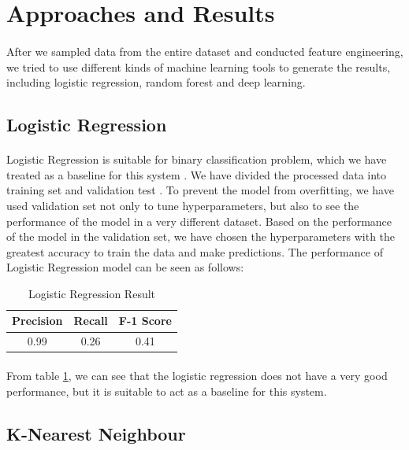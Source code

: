 \documentclass[fleqn,11pt]{olplainarticle}
\begin{document}
\section{Approaches and Results}\label{appres}
\paragraph*{}
After we sampled data from the entire dataset and conducted feature engineering, we tried to use different kinds of machine learning tools to generate the results, including logistic regression, random forest and deep learning.

\subsection{Logistic Regression}\label{lr}
\paragraph*{}
Logistic Regression is suitable for binary classification problem, which we have treated as a baseline for this system \citep{menard_lr}. We have divided the processed data into training set and validation test \citep{scikit-learn}. To prevent the model from overfitting, we have used validation set not only to tune hyperparameters, but also to see the performance of the model in a very different dataset. Based on the performance of the model in the validation set, we have chosen the hyperparameters with the greatest accuracy to train the data and make predictions. The performance of Logistic Regression model can be seen as follows:

\begin{table}[!htbp]
\centering
\caption{Logistic Regression Result}\label{tab:lr}
\begin{tabular}{ccc}
\toprule
Precision& Recall& F-1 Score\\
\midrule
0.99& 0.26& 0.41\\
\bottomrule
\end{tabular}
\end{table}
\paragraph*{}
From table \ref{tab:lr}, we can see that the logistic regression does not have a very good performance, but it is suitable to act as a baseline for this system.

\subsection{K-Nearest Neighbour}\label{knn}
\end{document}
